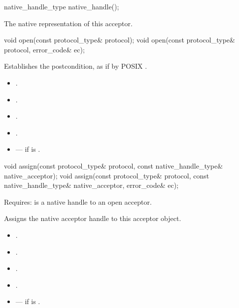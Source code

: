 \begin{itemdecl}
native_handle_type native_handle();
\end{itemdecl}

\begin{itemdescr}
\pnum
\returns The native representation of this acceptor.
\end{itemdescr}

\begin{itemdecl}
void open(const protocol_type& protocol);
void open(const protocol_type& protocol, error_code& ec);
\end{itemdecl}

\begin{itemdescr}
\pnum
\effects Establishes the postcondition, as if by POSIX .

\pnum
\postconditions 
\begin{itemize}
\item
{}.
\item
{}.
\item
{}.
\item
{}.
\end{itemize}

\pnum
\errors
\begin{itemize}
\item
{} --- if  is .
\end{itemize}
\end{itemdescr}

\begin{itemdecl}
void assign(const protocol_type& protocol,
            const native_handle_type& native_acceptor);
void assign(const protocol_type& protocol,
            const native_handle_type& native_acceptor, error_code& ec);
\end{itemdecl}

\begin{itemdescr}
\pnum
Requires:  is a native handle to an open acceptor.

\pnum
\effects Assigns the native acceptor handle to this acceptor object.

\pnum
\postconditions 
\begin{itemize}
\item
{}.
\item
{}.
\item
{}.
\item
{}.
\end{itemize}

\pnum
\errors
\begin{itemize}
\item
{} --- if  is .
\end{itemize}
\end{itemdescr}

